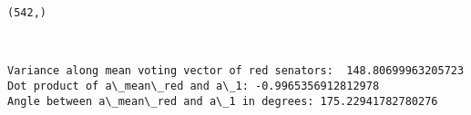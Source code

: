 \documentclass[11pt]{article}
\begin{document}
    \begin{Verbatim}[commandchars=\\\{\}]
(542,)

    \end{Verbatim}

    \begin{center}
    \end{center}
    { \hspace*{\fill} \\}
    
    \begin{Verbatim}[commandchars=\\\{\}]
Variance along mean voting vector of red senators:  148.80699963205723
Dot product of a\_mean\_red and a\_1: -0.9965356912812978
Angle between a\_mean\_red and a\_1 in degrees: 175.22941782780276

    \end{Verbatim}
\end{document}
